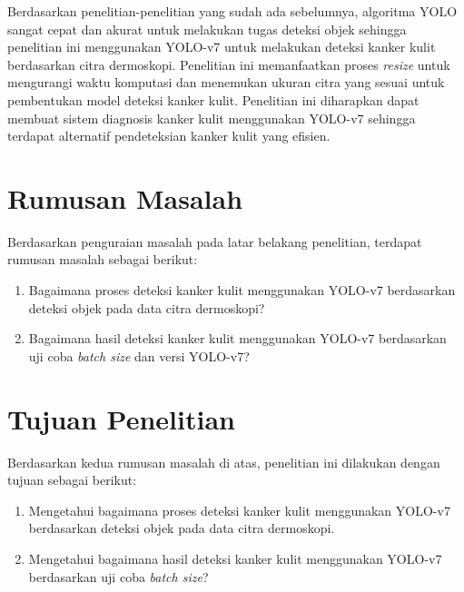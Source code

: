     Berdasarkan penelitian-penelitian yang sudah ada sebelumnya, algoritma YOLO sangat cepat dan akurat untuk melakukan tugas deteksi objek sehingga penelitian ini menggunakan YOLO-v7 untuk melakukan deteksi kanker kulit berdasarkan citra dermoskopi. Penelitian ini memanfaatkan proses \textit{resize} untuk mengurangi waktu komputasi dan menemukan ukuran citra yang sesuai untuk pembentukan model deteksi kanker kulit. Penelitian ini diharapkan dapat membuat sistem diagnosis kanker kulit menggunakan YOLO-v7 sehingga terdapat alternatif pendeteksian kanker kulit yang efisien.

    \section{Rumusan Masalah}
    Berdasarkan penguraian masalah pada latar belakang penelitian, terdapat rumusan masalah sebagai berikut:
    \begin{enumerate}
        \item Bagaimana proses deteksi kanker kulit menggunakan YOLO-v7 berdasarkan deteksi objek pada data citra dermoskopi?
        \item Bagaimana hasil deteksi kanker kulit menggunakan YOLO-v7 berdasarkan uji coba \textit{batch size} dan versi YOLO-v7?
    \end{enumerate}

    \section{Tujuan Penelitian}
    Berdasarkan kedua rumusan masalah di atas, penelitian ini dilakukan dengan tujuan sebagai berikut:
    \begin{enumerate}
        \item Mengetahui bagaimana proses deteksi kanker kulit menggunakan YOLO-v7 berdasarkan deteksi objek pada data citra dermoskopi.
        \item Mengetahui bagaimana hasil deteksi kanker kulit menggunakan YOLO-v7 berdasarkan uji coba \textit{batch size}?
    \end{enumerate}

